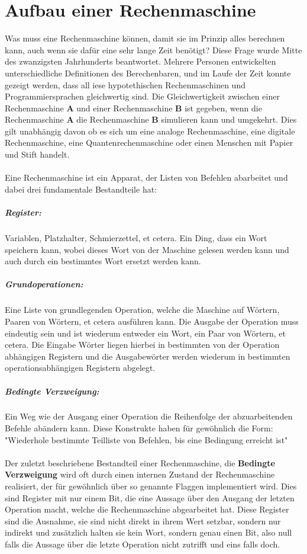 \documentclass[11pt,a4paper,leqno]{report}
\numberwithin{equation}{chapter}
\begin{document}
\chapter{Aufbau einer Rechenmaschine}
Was muss eine Rechenmaschine können, damit sie im Prinzip alles berechnen kann, auch wenn sie dafür eine sehr lange Zeit benötigt? Diese Frage wurde Mitte des zwanzigsten Jahrhunderts beantwortet. Mehrere Personen entwickelten unterschiedliche Definitionen des Berechenbaren, und im Laufe der Zeit konnte gezeigt werden, dass all 
iese hypotethischen Rechenmaschinen und Programmiersprachen gleichwertig sind. Die Gleichwertigkeit zwischen einer Rechenmaschine \textbf{A} und einer Rechenmaschine \textbf{B} ist gegeben, wenn die\\ Rechenmaschine \textbf{A} die Rechenmaschine \textbf{B} simulieren kann und umgekehrt. Dies gilt unabhängig davon ob es sich um eine analoge Rechenmaschine, eine digitale Rechenmaschine, eine Quantenrechenmaschine oder einen Menschen mit Papier und Stift handelt.\\
\\
Eine Rechenmaschine ist ein Apparat, der Listen von Befehlen abarbeitet und dabei drei fundamentale Bestandteile hat:
\paragraph{Register:} Variablen, Platzhalter, Schmierzettel, et cetera. Ein Ding, dass ein Wort speichern kann, wobei dieses Wort von der Maschine gelesen werden kann und auch durch ein bestimmtes Wort ersetzt werden kann.
\paragraph{Grundoperationen:} Eine Liste von grundlegenden Operation, welche die Maschine auf Wörtern, Paaren von Wörtern, et cetera ausführen kann. Die Ausgabe der Operation muss eindeutig sein und ist wiederum entweder ein Wort, ein Paar von Wörtern, et cetera. Die Eingabe Wörter liegen hierbei in bestimmten von der Operation abhängigen Registern und die Ausgabewörter werden wiederum in bestimmten operationsabhängigen Registern abgelegt.
\paragraph{Bedingte Verzweigung:} Ein Weg wie der Ausgang einer Operation die Reihenfolge der abzuarbeitenden Befehle abändern kann. Diese Konstrukte haben für gewöhnlich die Form: "Wiederhole bestimmte Teilliste von Befehlen, bis eine Bedingung erreicht ist"
\\
\\
Der zuletzt beschriebene Bestandteil einer Rechenmaschine, die \textbf{Bedingte Verzweigung} wird oft durch einen internen Zustand der Rechenmaschine realisiert, der für gewöhnlich über so genannte Flaggen implementiert wird. Dies sind Register mit nur einem Bit, die eine Aussage über den Ausgang der letzten Operation macht, welche die Rechenmaschine abgearbeitet hat. Diese Register sind die Ausnahme, sie sind nicht direkt in ihrem Wert setzbar, sondern nur indirekt und zusätzlich halten sie kein Wort, sondern genau einen Bit, also null falls die Aussage über die letzte Operation nicht zutrifft und eins falls doch.
\newpage
\end{document}
